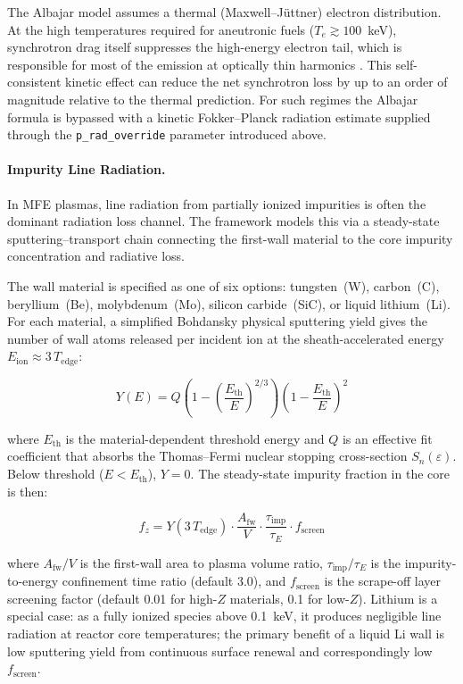 \documentclass{article}
\begin{document}
The Albajar model assumes a thermal (Maxwell--J\"uttner) electron
distribution. At the high temperatures required for aneutronic fuels
($T_e \gtrsim 100$~keV), synchrotron drag itself suppresses the
high-energy electron tail, which is responsible for most of the
emission at optically thin harmonics \citep{ochs2024}. This
self-consistent kinetic effect can reduce the net synchrotron loss by
up to an order of magnitude relative to the thermal prediction. For
such regimes the Albajar formula is bypassed with a kinetic
Fokker--Planck radiation estimate supplied through the
\texttt{p\_rad\_override} parameter introduced above.

\paragraph{Impurity Line Radiation.}
In MFE plasmas, line radiation from partially ionized impurities is
often the dominant radiation loss channel. The framework models this
via a steady-state sputtering--transport chain connecting the
first-wall material to the core impurity concentration and radiative
loss.

The wall material is specified as one of six options: tungsten~(W),
carbon~(C), beryllium~(Be), molybdenum~(Mo), silicon carbide~(SiC),
or liquid lithium~(Li). For each material, a simplified Bohdansky
physical sputtering yield \citep{bohdansky1984, eckstein2007} gives
the number of wall atoms released per incident ion at the
sheath-accelerated energy $E_{\text{ion}} \approx 3\,T_{\text{edge}}$:

\begin{equation}
\label{eq:sputtering}
Y(E) = Q \left(1 - \left(\frac{E_{\text{th}}}{E}\right)^{2/3}\right)
       \left(1 - \frac{E_{\text{th}}}{E}\right)^{2}
\end{equation}

\noindent where $E_{\text{th}}$ is the material-dependent threshold
energy and $Q$ is an effective fit coefficient that absorbs the
Thomas--Fermi nuclear stopping cross-section $S_n(\varepsilon)$. Below
threshold ($E < E_{\text{th}}$), $Y = 0$. The steady-state impurity fraction in the core is then:

\begin{equation}
\label{eq:f-impurity}
f_z = Y(3\,T_{\text{edge}}) \cdot
  \frac{A_{\text{fw}}}{V} \cdot
  \frac{\tau_{\text{imp}}}{\tau_E} \cdot f_{\text{screen}}
\end{equation}

\noindent where $A_{\text{fw}}/V$ is the first-wall area to plasma
volume ratio, $\tau_{\text{imp}}/\tau_E$ is the impurity-to-energy
confinement time ratio (default 3.0), and $f_{\text{screen}}$ is the
scrape-off layer screening factor (default 0.01 for high-$Z$
materials, 0.1 for low-$Z$). Lithium is a special case: as a fully
ionized species above 0.1~keV, it produces negligible line
radiation at reactor core temperatures; the primary benefit of a
liquid Li wall is low sputtering yield from continuous surface renewal
and correspondingly low $f_{\text{screen}}$.
\end{document}
